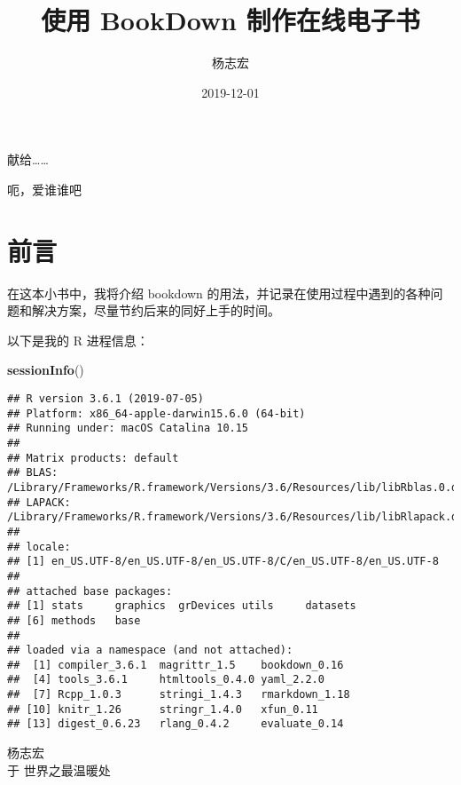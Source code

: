 \documentclass[]{ctexbook}
\title{使用 BookDown 制作在线电子书}
\author{杨志宏}
\date{2019-12-01}
\newenvironment{Shaded}{\begin{snugshade}}{\end{snugshade}}
\newcommand{\KeywordTok}[1]{\textcolor[rgb]{0.13,0.29,0.53}{\textbf{#1}}}
\newcommand{\NormalTok}[1]{#1}
\let\BeginKnitrBlock\begin \let\EndKnitrBlock\end
\begin{document}
\maketitle


\thispagestyle{empty}

\begin{center}
献给……

呃，爱谁谁吧
\end{center}

\setlength{\abovedisplayskip}{-5pt}
\setlength{\abovedisplayshortskip}{-5pt}

{
\setcounter{tocdepth}{2}
\tableofcontents
}
\listoftables
\listoffigures
\hypertarget{ux524dux8a00}{%
\chapter*{前言}\label{ux524dux8a00}}


在这本小书中，我将介绍 bookdown 的用法，并记录在使用过程中遇到的各种问题和解决方案，尽量节约后来的同好上手的时间。

以下是我的 R 进程信息：

\begin{Shaded}
\begin{Highlighting}[]
\KeywordTok{sessionInfo}\NormalTok{()}
\end{Highlighting}
\end{Shaded}

\begin{verbatim}
## R version 3.6.1 (2019-07-05)
## Platform: x86_64-apple-darwin15.6.0 (64-bit)
## Running under: macOS Catalina 10.15
## 
## Matrix products: default
## BLAS:   /Library/Frameworks/R.framework/Versions/3.6/Resources/lib/libRblas.0.dylib
## LAPACK: /Library/Frameworks/R.framework/Versions/3.6/Resources/lib/libRlapack.dylib
## 
## locale:
## [1] en_US.UTF-8/en_US.UTF-8/en_US.UTF-8/C/en_US.UTF-8/en_US.UTF-8
## 
## attached base packages:
## [1] stats     graphics  grDevices utils     datasets 
## [6] methods   base     
## 
## loaded via a namespace (and not attached):
##  [1] compiler_3.6.1  magrittr_1.5    bookdown_0.16  
##  [4] tools_3.6.1     htmltools_0.4.0 yaml_2.2.0     
##  [7] Rcpp_1.0.3      stringi_1.4.3   rmarkdown_1.18 
## [10] knitr_1.26      stringr_1.4.0   xfun_0.11      
## [13] digest_0.6.23   rlang_0.4.2     evaluate_0.14
\end{verbatim}

\BeginKnitrBlock{flushright}
杨志宏\\
于 世界之最温暖处
\EndKnitrBlock{flushright}
\end{document}
